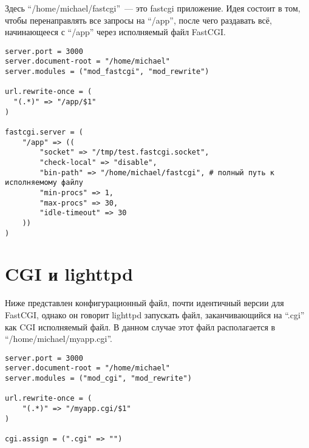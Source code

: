 Здесь ``/home/michael/fastcgi''~--- это fastcgi приложение. Идея состоит в том,
чтобы перенаправлять все запросы на ``/app'', после чего раздавать всё,
начинающееся с ``/app'' через исполняемый файл FastCGI.

\begin{lstlisting}
server.port = 3000
server.document-root = "/home/michael"
server.modules = ("mod_fastcgi", "mod_rewrite")

url.rewrite-once = (
  "(.*)" => "/app/$1"
)

fastcgi.server = (
    "/app" => ((
        "socket" => "/tmp/test.fastcgi.socket",
        "check-local" => "disable",
        "bin-path" => "/home/michael/fastcgi", # полный путь к исполняемому файлу
        "min-procs" => 1,
        "max-procs" => 30,
        "idle-timeout" => 30
    ))
)
\end{lstlisting}%

\section{CGI и lighttpd}
Ниже представлен конфигурационный файл, почти идентичный версии для FastCGI,
однако он говорит lighttpd запускать файл, заканчивающийся на ``.cgi'' как CGI
исполняемый файл. В данном случае этот файл располагается в
``/home/michael/myapp.cgi''.
\begin{lstlisting}
server.port = 3000
server.document-root = "/home/michael"
server.modules = ("mod_cgi", "mod_rewrite")

url.rewrite-once = (
    "(.*)" => "/myapp.cgi/$1"
)

cgi.assign = (".cgi" => "")
\end{lstlisting}
